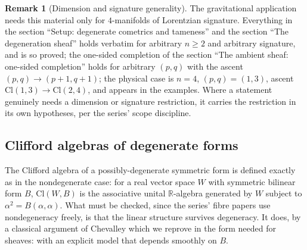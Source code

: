 \documentclass[11pt]{article}
\theoremstyle{definition}
\newtheorem{remark}[theorem]{Remark}
\theoremstyle{plain}
\providecommand{\Cl}{}\renewcommand{\Cl}{\mathrm{Cl}}
\providecommand{\R}{}\renewcommand{\R}{\mathbb{R}}
\begin{document}
\begin{remark}[Dimension and signature generality]\label{c:note.sheaf.dimension-signature-generality}
The gravitational application needs this material only for $4$-manifolds of Lorentzian signature. Everything in the section ``Setup: degenerate cometrics and tameness'' and the section ``The degeneration sheaf'' holds verbatim for arbitrary $n \geq 2$ and arbitrary signature, and is so proved; the one-sided completion of the section ``The ambient sheaf: one-sided completion'' holds for arbitrary $(p,q)$ with the ascent $(p,q) \to (p{+}1,q{+}1)$; the physical case is $n = 4$, $(p,q) = (1,3)$, ascent $\Cl(1,3) \to \Cl(2,4)$, and appears in the examples. Where a statement genuinely needs a dimension or signature restriction, it carries the restriction in its own hypotheses, per the series' scope discipline.
\end{remark}

\subsection*{Clifford algebras of degenerate forms}
\label{c:note.sheaf.setting-clifford-algebras-degenerate-forms}
The Clifford algebra of a possibly-degenerate symmetric form is defined exactly as in the nondegenerate case: for a real vector space $W$ with symmetric bilinear form $B$, $\Cl(W, B)$ is the associative unital $\R$-algebra generated by $W$ subject to $\alpha^2 = B(\alpha, \alpha)$. What must be checked, since the series' fibre papers \cite{ButlerT1} use nondegeneracy freely, is that the linear structure survives degeneracy. It does, by a classical argument of Chevalley \cite{Chevalley1997} which we reprove in the form needed for sheaves: with an explicit model that depends smoothly on $B$.
\end{document}
